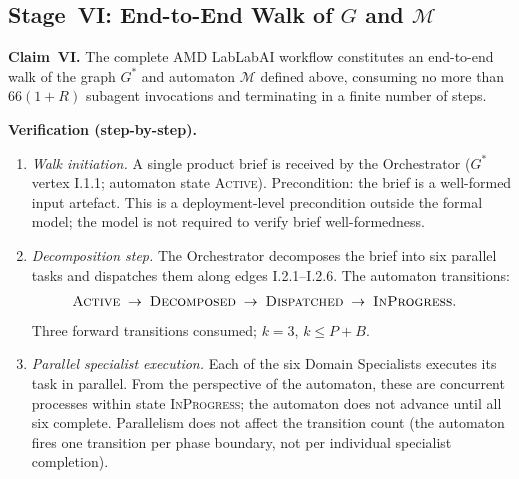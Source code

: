 \documentclass[12pt]{article}
\theoremstyle{definition}
\begin{document}
\subsection{Stage~VI: End-to-End Walk of $G$ and $\mathcal{M}$}
\label{sec:case-study-walk}

\noindent\textbf{Claim~VI.}  The complete AMD LabLabAI workflow
constitutes an end-to-end walk of the graph $G^{*}$ and automaton
$\mathcal{M}$ defined above, consuming no more than $66(1+R)$
subagent invocations and terminating in a finite number of steps.

\medskip
\noindent\textbf{Verification (step-by-step).}
\begin{enumerate}
    \item[VI.1] \emph{Walk initiation.}  A single product brief is
                received by the Orchestrator ($G^{*}$ vertex I.1.1;
                automaton state \textsc{Active}).  Precondition: the
                brief is a well-formed input artefact.  This is a
                deployment-level precondition outside the formal model;
                the model is not required to verify brief
                well-formedness. \checkmark

    \item[VI.2] \emph{Decomposition step.}  The Orchestrator
                decomposes the brief into six parallel tasks and
                dispatches them along edges I.2.1--I.2.6.  The
                automaton transitions:
                \begin{align}
                    \textsc{Active}
                    &\;\to\; \textsc{Decomposed}
                    \;\to\; \textsc{Dispatched}
                    \;\to\; \textsc{InProgress}.
                    \notag
                \end{align}
                Three forward transitions consumed; $k = 3$,
                $k \leq P + B$. \checkmark

    \item[VI.3] \emph{Parallel specialist execution.}  Each of the
                six Domain Specialists executes its task in parallel.
                From the perspective of the automaton, these are
                concurrent processes within state \textsc{InProgress};
                the automaton does not advance until all six complete.
                Parallelism does not affect the transition count (the
                automaton fires one transition per phase boundary,
                not per individual specialist completion). \checkmark


\end{enumerate}
\end{document}
